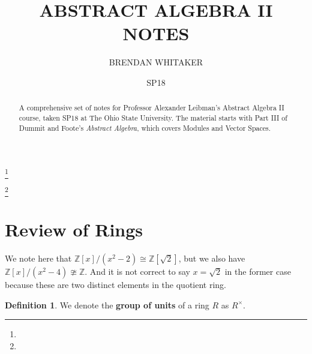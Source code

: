 \documentclass[12pt]{amsbook}
\theoremstyle{plain}
\numberwithin{section}{chapter}
\numberwithin{equation}{chapter}
\theoremstyle{definition}
\newtheorem{Def}[theorem]{Definition}
\theoremstyle{remark}
\begin{document}
\frontmatter

\title{ABSTRACT ALGEBRA II NOTES}


\author{BRENDAN WHITAKER}
\address{}
\curraddr{}
\email{}
\thanks{}

\author{}
\address{}
\curraddr{}
\email{}
\thanks{}


\keywords{}

\date{SP18}

\begin{abstract}
A comprehensive set of notes for Professor Alexander Leibman's Abstract Algebra II course, taken SP18 at The Ohio State University. The material starts with Part III of Dummit and Foote's \textit{Abstract Algebra}, which covers Modules and Vector Spaces. 
\end{abstract}

\maketitle


\setcounter{page}{4}

\tableofcontents

%

\section{Review of Rings}

We note here that $\mathbb{Z}[x]/(x^2 - 2) \cong \mathbb{Z}[\sqrt{2}]$, but we also have $\mathbb{Z}[x]/(x^2 - 4) \ncong \mathbb{Z}$. And it is not correct to say $x = \sqrt{2}$ in the former case because these are two distinct elements in the quotient ring. 

\begin{Def}
We denote the \textbf{group of units} of a ring $R$ as $R^\times$. 
\end{Def}
\end{document}
